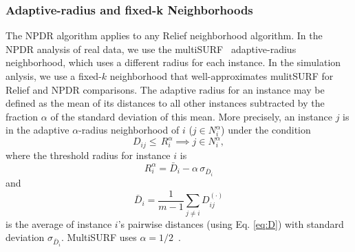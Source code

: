 \documentclass{bioinfo}
\begin{document}
\subsubsection{Adaptive-radius and fixed-k Neighborhoods}
The NPDR algorithm applies to any Relief neighborhood algorithm.
In the NPDR analysis of real data, we use the multiSURF~\citep{urbanowicz17} adaptive-radius neighborhood, which uses a different radius for each instance. In the simulation anlysis, we use a fixed-$k$ neighborhood that well-approximates mulitSURF for Relief and NPDR comparisons. %
The adaptive radius for an instance may be defined as the mean of its distances to all other instances subtracted by the fraction $\alpha$ of the standard deviation of this mean.
More precisely, an instance $j$ is in the adaptive $\alpha$-radius neighborhood of $i$ ($j \in N^{\alpha}_{i}$) under the condition
%
%
\begin{equation}
D_{ij} \le \, R_i^{\alpha} \implies j \in N^{\alpha}_{i},
\end{equation}
where the threshold radius for instance $i$ is
\begin{equation} 
R_i^{\alpha} =  \bar{D}_i - \alpha \, \sigma_{\bar{D}_i}
\end{equation}
and 
\begin{equation}
\bar{D}_i = \frac{1}{m-1} \sum_{j \ne i} D^{(\cdot)}_{ij}
\end{equation}
is the average of instance $i$'s pairwise distances (using Eq. \ref{eq:D}) with standard deviation $\sigma_{\bar{D}_i}$.
MultiSURF uses $\alpha=1/2$~\citep{msurf13}.
 
\end{document}
